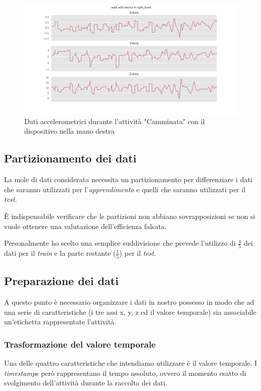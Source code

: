 \begin{figure}[H]
    \centering
    \includegraphics[scale = 0.45]{assets/images/classifications/accelerometer/right_hand/walk-right-hand-acc.png}
    \caption{Dati accelerometrici durante l'attività "Camminata" con il dispositivo nella mano destra}
\end{figure}


\subsection{Partizionamento dei dati}
La mole di dati considerata necessita un partizionamento per differenziare i dati che saranno utilizzati per 
l'\textit{apprendimento} e quelli che saranno utilizzati per il \textit{test}.

È indispensabile verificare che le partizioni non abbiano sovrapposizioni se non si vuole ottenere una valutazione dell'efficienza falsata.

\vspace{5mm} %

Personalmente ho scelto una semplice suddivisione che prevede l'utilizzo di $\frac{4}{5}$ dei dati per il \textit{train} e 
la parte restante ($\frac{1}{5}$) per il \textit{test}.


\subsection{Preparazione dei dati}
\label{section:learning-data-preparation}
A questo punto è necessario organizzare i dati in nostro possesso in modo che 
ad una serie di caratteristiche (i tre assi x, y, z ed il valore temporale) sia associabile un'etichetta 
rappresentate l'attività. 

\subsubsection{Trasformazione del valore temporale}
Una delle quattro caratteristiche che intendiamo utilizzare è il valore temporale.
I \textit{timestamp}s però rappresentano il tempo assoluto, 
ovvero il momento esatto di svolgimento dell'attività durante la raccolta dei dati.

